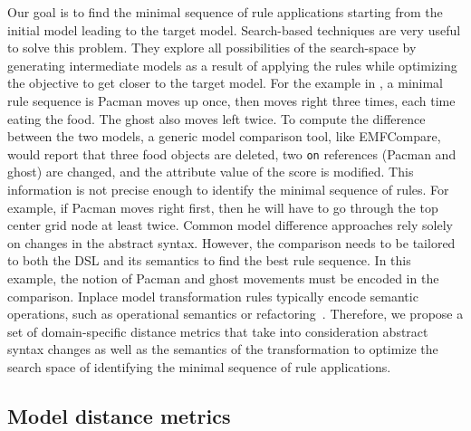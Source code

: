 Our goal is to find the minimal sequence of rule applications starting from the initial model leading to the target model.
Search-based techniques are very useful to solve this problem.
They explore all possibilities of the search-space by generating intermediate models as a result of applying the rules while optimizing the objective to get closer to the target model.
For the example in , a minimal rule sequence is Pacman moves up once, then moves right three times, each time eating the food.
The ghost also moves left twice.
To compute the difference between the two models, a generic model comparison tool, like EMFCompare, would report that three food objects are deleted, two \texttt{on} references (Pacman and ghost) are changed, and the attribute value of the score is modified.
This information is not precise enough to identify the minimal sequence of rules.
For example, if Pacman moves right first, then he will have to go through the top center grid node at least twice.
Common model difference approaches rely solely on changes in the abstract syntax.
However, the comparison needs to be tailored to both the DSL and its semantics to find the best rule sequence.
In this example, the notion of Pacman and ghost movements must be encoded in the comparison.
Inplace model transformation rules typically encode semantic operations, such as operational semantics or refactoring~\cite{Lucio2016}.
Therefore, we propose a set of domain-specific distance metrics that take into consideration abstract syntax changes as well as the semantics of the transformation to optimize the search space of identifying the minimal sequence of rule applications.
%
%    
%    

\subsection{Model distance metrics}


